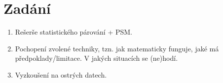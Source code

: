 \section{Zadání}

\begin{enumerate}
    \item Rešerše statistického párování + PSM.
    \item Pochopení zvolené techniky, tzn. jak matematicky funguje, jaké má předpoklady/limitace. V jakých situacích se (ne)hodí.
    \item Vyzkoušení na ostrých datech.
\end{enumerate}
